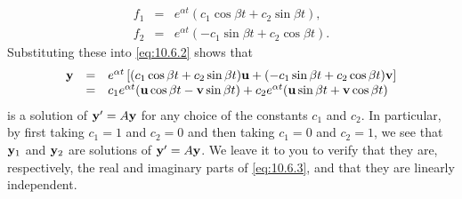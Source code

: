 \documentclass{ximera}
\begin{document}
\begin{eqnarray*}
f_1&=&e^{\alpha t}(c_1\cos\beta t+c_2\sin\beta t ),\\
f_2&=&e^{\alpha t}(-c_1\sin\beta t+c_2\cos\beta t).
\end{eqnarray*}
Substituting these into \eqref{eq:10.6.2} shows that
\begin{equation} \label{eq:10.6.5}
\begin{array}{rcl}
{\bf y}&=&e^{\alpha t}\left[(c_1\cos\beta t+c_2\sin\beta t){\bf u}
+(-c_1\sin\beta t+c_2\cos\beta t){\bf v}\right]\\
&=&c_1e^{\alpha t}({\bf u}\cos\beta t-{\bf v}\sin\beta t)
+c_2e^{\alpha t}({\bf u}\sin\beta t+{\bf v}\cos\beta t)
\end{array}
\end{equation}
is a solution of ${\bf y}'=A{\bf y}$ for any choice of the constants
$c_1$ and $c_2$. In particular, by first taking $c_1=1$ and $c_2=0$
and then taking $c_1=0$ and $c_2=1$, we see that ${\bf y}_1$ and ${\bf
y}_2$ are solutions of $ {\bf y}'=A{\bf y}$. We leave it to you to
verify that they are, respectively, the real and imaginary parts of
\eqref{eq:10.6.3}, %
and that they are linearly
independent. %
\end{document}
